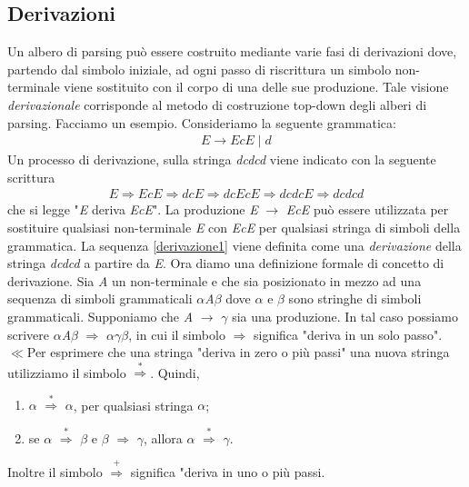 \subsection{Derivazioni}
Un albero di parsing \cite{libro: compilatori} può essere costruito mediante varie fasi di derivazioni dove, partendo dal simbolo iniziale, ad ogni passo di riscrittura un simbolo non-terminale viene sostituito con il corpo di una delle sue produzione. Tale visione \textit{derivazionale} corrisponde al metodo di costruzione top-down degli alberi di parsing.
Facciamo un esempio. Consideriamo la seguente grammatica:
\begin{align}\label{grammaticaEspressioni}
	E \to EcE \mid d 
\end{align}
Un processo di derivazione, sulla stringa \textit{dcdcd} viene indicato con la seguente scrittura
\begin{align}\label{derivazione1}
	E \Rightarrow EcE \Rightarrow dcE \Rightarrow dcEcE \Rightarrow dcdcE \Rightarrow dcdcd
\end{align}
che si legge "\textit{E} deriva \textit{EcE}". La produzione \textit{E} $\to$ \textit{EcE} può essere utilizzata per sostituire qualsiasi non-terminale \textit{E} con \textit{EcE} per qualsiasi stringa di simboli della grammatica. La sequenza \ref{derivazione1} viene definita come una \textit{derivazione} della stringa \textit{dcdcd} a partire da \textit{E}. Ora diamo una definizione formale di concetto di derivazione. Sia \textit{A} un non-terminale e che sia posizionato in mezzo ad una sequenza di simboli grammaticali $\alpha$\textit{A}$\beta$ dove $\alpha$ e $\beta$ sono stringhe di simboli grammaticali. Supponiamo che \textit{A} $\to$ $\gamma$ sia una produzione. In tal caso possiamo scrivere $\alpha$\textit{A}$\beta$ $\Rightarrow$ $\alpha$$\gamma$$\beta$, in cui il simbolo $\Rightarrow$ significa "deriva in un solo passo". $\ll$Per esprimere che una stringa "deriva in zero o più passi" una nuova stringa utilizziamo il simbolo $\overset{*}{\Rightarrow}$. Quindi, 
\begin{enumerate}
	\item $\alpha$ $\overset{*}{\Rightarrow}$ $\alpha$, per qualsiasi stringa $\alpha$;
	\item  se $\alpha$ $\overset{*}{\Rightarrow}$ $\beta$ e $\beta$ $\Rightarrow$ $\gamma$, allora $\alpha$ $\overset{*}{\Rightarrow}$ $\gamma$.
\end{enumerate} 
Inoltre il simbolo $\overset{+}{\Rightarrow}$ significa "deriva in uno o più passi. \par
